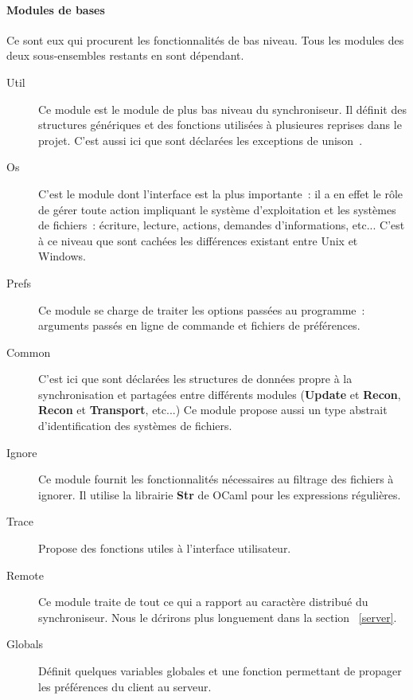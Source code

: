 \documentclass[11pt]{report}
\newcommand{\modu}[1]{\textbf{#1}}
\newcommand{\unison}{unison}
\begin{document}
{\paragraph{Modules de bases\\}
Ce sont eux qui procurent les fonctionnalit\'es de bas niveau. Tous les 
modules des deux sous-ensembles restants en sont d\'ependant.\\
\begin{description}
\item [Util] Ce module est le module de plus bas niveau du synchroniseur.
Il d\'efinit des structures g\'en\'eriques et des fonctions utilis\'ees \`a 
plusieures reprises dans le projet. C'est aussi ici que sont d\'eclar\'ees 
les exceptions de \unison\ .
\item [Os] C'est le module dont l'interface est la plus importante~:
il a en effet le r\^ole de g\'erer toute action impliquant le syst\`eme 
d'exploitation et les syst\`emes de fichiers~: \'ecriture, lecture, actions,
demandes d'informations, etc... C'est \`a ce niveau que sont cach\'ees les 
diff\'erences existant entre Unix et Windows.
\item [Prefs] Ce module se charge de traiter les options pass\'ees au
programme~: arguments pass\'es en ligne de commande et fichiers 
de pr\'ef\'erences.
\item [Common] C'est ici que sont d\'eclar\'ees les structures de donn\'ees
propre \`a la synchronisation et partag\'ees entre diff\'erents modules
(\modu{Update} et \modu{Recon}, \modu{Recon} et \modu{Transport}, etc...) 
Ce module propose aussi un type abstrait d'identification des syst\`emes de 
fichiers.
\item [Ignore] Ce module fournit les fonctionnalit\'es n\'ecessaires au
  filtrage des fichiers \`a ignorer. Il utilise la librairie \modu{Str}
de OCaml pour les expressions r\'eguli\`eres.
\item [Trace] Propose des fonctions utiles \`a l'interface utilisateur.
\item [Remote] Ce module traite de tout ce qui a rapport au caract\`ere
  distribu\'e du synchroniseur. Nous le d\'crirons plus longuement dans la
section ~\ref{server}.
\item [Globals] D\'efinit quelques variables globales et une fonction
permettant de propager les pr\'ef\'erences du client au serveur.
\end{description}
}
\end{document}
